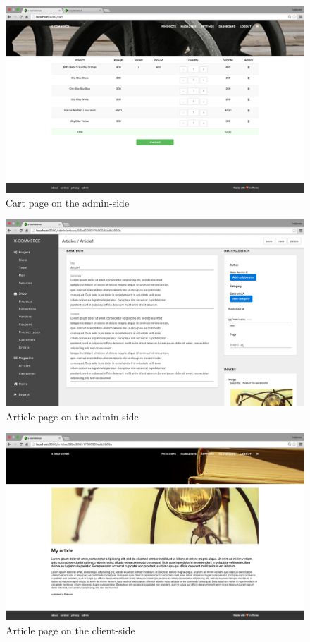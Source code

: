 \begin{figure}[htb]
\centering
\includegraphics[width=0.84\linewidth]{images/chapter4/page-cart.png}\hfill
\caption[Cart page on the admin-side]{Cart page on the admin-side}
\label{fig:page_cart_cli}
\end{figure}
\newpage
\begin{figure}[htb]
\centering
\includegraphics[width=0.84\linewidth]{images/chapter4/page-article-adm.png}\hfill
\caption[Article page on the admin-side]{Article page on the admin-side}
\label{fig:page_article_admin}
\end{figure}
\begin{figure}[htb]
\centering
\includegraphics[width=0.84\linewidth]{images/chapter4/page-article-cli.png}\hfill
\caption[Article page on the client-side]{Article page on the client-side}
\label{fig:page_article_cli}
\end{figure}

